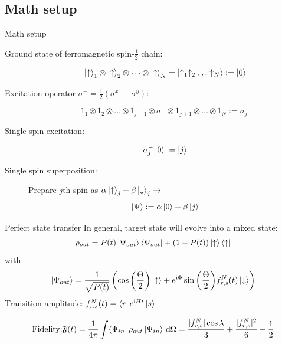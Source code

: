\documentclass{beamer}
\begin{document}
\subsection{Math setup}
\begin{frame}{Math setup}
	\begin{description}
	\item [Ground state of ferromagnetic spin-$\frac{1}{2}$ chain:] \[ \ket{\uparrow}_1 \otimes \ket{\uparrow}_2 \otimes \dots \otimes \ket{\uparrow}_N = \ket{\uparrow_1\uparrow_2\dots\uparrow_N} := \ket{0} \]
	\item [Excitation operator $\sigma^- = \frac{1}{2}\left(\sigma^x - \text{i}\sigma^y\right)$:] \[ \text{1}_1 \otimes \text{1}_2 \otimes \dots \otimes \text{1}_{j-1} \otimes \sigma^- \otimes \text{1}_{j+1} \otimes \dots \otimes \text{1}_N := \sigma^-_j \]
	\item [Single spin excitation:] \[ \sigma^-_j\ket{0} := \ket{j} \]
	\item [Single spin superposition:] Prepare $j$th spin as $\alpha\ket{\uparrow}_j + \beta\ket{\downarrow}_j \rightarrow$ \[ \ket{\Psi} := \alpha\ket{0} + \beta\ket{j} \]
	\end{description}
\end{frame}

\begin{frame}{Perfect state transfer}
	In general, target state will evolve into a mixed state:\\
	\[ \rho_{out} = P(t)\ket{\Psi_{out}}\bra{\Psi_{out}} + \left( 1-P(t) \right)\ket{\uparrow}\bra{\uparrow} \]
	with
	\[ \ket{\Psi_{out}} = \frac{1}{\sqrt{P(t)}}\left( \cos{\left(\frac{\Theta}{2}\right)} \ket{\uparrow} + e^{\text{i}\Phi}\sin{\left(\frac{\Theta}{2}\right)}f^N_{r,s}(t)\ket{\downarrow} \right) \]
	Transition amplitude: $f^N_{r,s}(t) = \bra{r}e^{\text{i}H t}\ket{s}$\\
	\begin{exampleblock}{}
	\setlength\abovedisplayskip{-8pt}
	\begin{center}
		\[ \text{Fidelity:}\mathfrak{F}(t) = \frac{1}{4\pi}\int \!\bra{\Psi_{in}}\rho_{out}\ket{\Psi_{in}} \, \mathrm{d}\Omega = \frac{\lvert f^N_{r,s}\rvert\cos{\lambda}}{3} + \frac{\lvert f^N_{r,s}\rvert^2}{6} + \frac{1}{2}\]
	\end{center}
	\end{exampleblock}
\end{frame}
\end{document}
